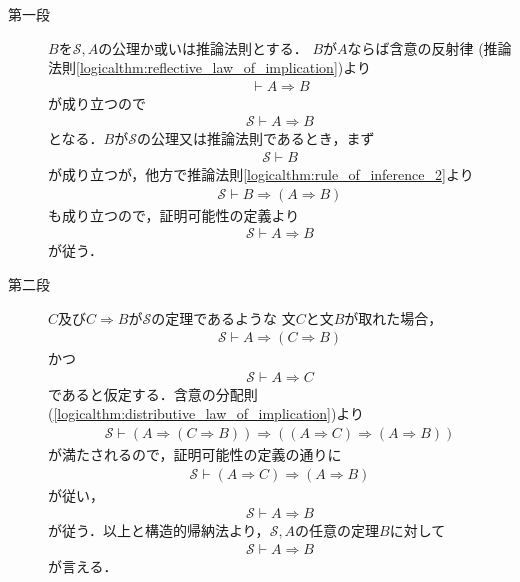 	\begin{metaprf}\mbox{}
		\begin{description}
			\item[第一段]
				$B$を$\mathscr{S},A$の公理か或いは推論法則とする．
				$B$が$A$ならば含意の反射律
				(推論法則\ref{logicalthm:reflective_law_of_implication})より
				\begin{align}
					\vdash A \Longrightarrow B
				\end{align}
				が成り立つので
				\begin{align}
					\mathscr{S} \vdash A \Longrightarrow B
				\end{align}
				となる．$B$が$\mathscr{S}$の公理又は推論法則であるとき，まず
				\begin{align}
					\mathscr{S} \vdash B
				\end{align}
				が成り立つが，他方で推論法則\ref{logicalthm:rule_of_inference_2}より
				\begin{align}
					\mathscr{S} \vdash B \Longrightarrow (A \Longrightarrow B) 
				\end{align}
				も成り立つので，証明可能性の定義より
				\begin{align}
					\mathscr{S} \vdash A \Longrightarrow B
				\end{align}
				が従う．
				
			\item[第二段]
				$C$及び$C \Longrightarrow B$が$\mathscr{S}$の定理であるような
				文$C$と文$B$が取れた場合，
				\begin{align}
					\mathscr{S} \vdash A \Longrightarrow (C \Longrightarrow B)
				\end{align}
				かつ
				\begin{align}
					\mathscr{S} \vdash A \Longrightarrow C
				\end{align}
				であると仮定する．含意の分配則
				(\ref{logicalthm:distributive_law_of_implication})より
				\begin{align}
					\mathscr{S} \vdash 
					(A \Longrightarrow (C \Longrightarrow B)) \Longrightarrow ((A \Longrightarrow C) \Longrightarrow (A \Longrightarrow B))
				\end{align}
				が満たされるので，証明可能性の定義の通りに
				\begin{align}
					\mathscr{S} \vdash (A \Longrightarrow C) \Longrightarrow (A \Longrightarrow B)
				\end{align}
				が従い，
				\begin{align}
					\mathscr{S} \vdash A \Longrightarrow B
				\end{align}
				が従う．以上と構造的帰納法より，$\mathscr{S},A$の任意の定理$B$に対して
				\begin{align}
					\mathscr{S} \vdash A \Longrightarrow B
				\end{align}
				が言える．
				\QED
		\end{description}
	\end{metaprf}
	
